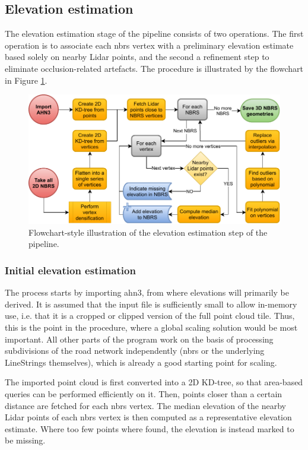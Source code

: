 \subsection{Elevation estimation}
\label{sub:m_elevationestimation}

The elevation estimation stage of the pipeline consists of two operations. The first operation is to associate each \ac{nbrs} vertex with a preliminary elevation estimate based solely on nearby Lidar points, and the second a refinement step to eliminate occlusion-related artefacts. The procedure is illustrated by the flowchart in Figure \ref{fig:elevationestimationflow}.

\begin{figure}
    \centering
    \includegraphics[width=0.9\linewidth]{final_report/figs/elevation_estimation.pdf}
    \caption{Flowchart-style illustration of the elevation estimation step of the pipeline.}
    \label{fig:elevationestimationflow}
\end{figure}

\subsubsection{Initial elevation estimation}

The process starts by importing \ac{ahn3}, from where elevations will primarily be derived. It is assumed that the input file is sufficiently small to allow in-memory use, i.e. that it is a cropped or clipped version of the full point cloud tile. Thus, this is the point in the procedure, where a global scaling solution would be most important. All other parts of the program work on the basis of processing subdivisions of the road network independently (\ac{nbrs} or the underlying LineStrings themselves), which is already a good starting point for scaling.

The imported point cloud is first converted into a 2D KD-tree, so that area-based queries can be performed efficiently on it. Then, points closer than a certain distance are fetched for each \ac{nbrs} vertex. The median elevation of the nearby Lidar points of each \ac{nbrs} vertex is then computed as a representative elevation estimate. Where too few points where found, the elevation is instead marked to be missing.

